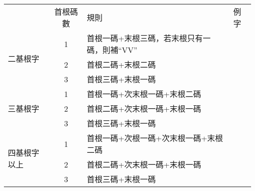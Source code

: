 \documentclass{article}
\begin{document}
\begin{tabular}{lcll}
           & 首根碼數 & 規則 & 例字\\
  \multirow{3}{*}{二基根字} & 1 & 首根一碼+末根三碼，若末根只有一碼，則補``VV''\\
  & 2 & 首根二碼+末根二碼\\
  & 3 & 首根三碼+末根一碼\\
  \multirow{3}{*}{三基根字} & 1 & 首根一碼+次末根一碼+末根二碼\\
  & 2 & 首根二碼+次末根一碼+末根一碼\\
  & 3 & 首根三碼+末根一碼\\
  \multirow{4}{*}{四基根字以上} & 1 & 首根一碼+次根一碼+次末根一碼+末根二碼\\
  & 2 & 首根二碼+次末根一碼+末根一碼\\
  & 3 & 首根三碼+末根一碼\\
\end{tabular}
\end{document}
